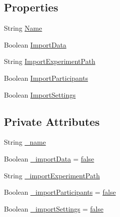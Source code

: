 \subsection*{Properties}
\begin{DoxyCompactItemize}
\item 
String \hyperlink{class_web_analyzer_1_1_events_1_1_create_experiment_event_a6e6e3eee6e63143be6e5ab7b329533c6}{Name}
\item 
Boolean \hyperlink{class_web_analyzer_1_1_events_1_1_create_experiment_event_a23ca6eb22cf95423be8b35c4b200da90}{Import\+Data}
\item 
String \hyperlink{class_web_analyzer_1_1_events_1_1_create_experiment_event_a9b9c24f0a0c60406c0f83ffbeefead50}{Import\+Experiment\+Path}
\item 
Boolean \hyperlink{class_web_analyzer_1_1_events_1_1_create_experiment_event_ac0f034fcfe34ab152d713b42e83c3125}{Import\+Participants}
\item 
Boolean \hyperlink{class_web_analyzer_1_1_events_1_1_create_experiment_event_ad7acdf21b15a8eb496b29b2ee4cd5d35}{Import\+Settings}
\end{DoxyCompactItemize}
\subsection*{Private Attributes}
\begin{DoxyCompactItemize}
\item 
String \hyperlink{class_web_analyzer_1_1_events_1_1_create_experiment_event_a9b05cacff687a5907c457a8ae95164b7}{\+\_\+name}
\item 
Boolean \hyperlink{class_web_analyzer_1_1_events_1_1_create_experiment_event_ae1fce6913b5681e97a9d07978e1faab2}{\+\_\+import\+Data} = \hyperlink{_u_i_2_h_t_m_l_resources_2js_2src_2export_8js_ae6c865df784842196d411c1466b01686}{false}
\item 
String \hyperlink{class_web_analyzer_1_1_events_1_1_create_experiment_event_a8c0fe703fb96fa2fa1f90d2610a8b22a}{\+\_\+import\+Experiment\+Path}
\item 
Boolean \hyperlink{class_web_analyzer_1_1_events_1_1_create_experiment_event_a59d45ed4f6d0829f185a23dca49f6f12}{\+\_\+import\+Participants} = \hyperlink{_u_i_2_h_t_m_l_resources_2js_2src_2export_8js_ae6c865df784842196d411c1466b01686}{false}
\item 
Boolean \hyperlink{class_web_analyzer_1_1_events_1_1_create_experiment_event_a0306b88d62bbb8558674ba1c9c2d1b00}{\+\_\+import\+Settings} = \hyperlink{_u_i_2_h_t_m_l_resources_2js_2src_2export_8js_ae6c865df784842196d411c1466b01686}{false}
\end{DoxyCompactItemize}


